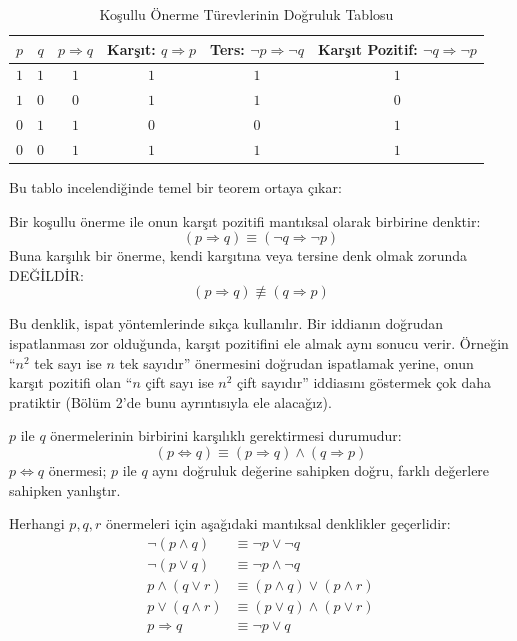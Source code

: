 \begin{table}[htbp]
\centering
\begin{tabular}{cc|c|c|c|c}
\toprule
$p$ & $q$ & $p \Rightarrow q$ & Karşıt: $q \Rightarrow p$ & Ters: $\neg p \Rightarrow \neg q$ & Karşıt Pozitif: $\neg q \Rightarrow \neg p$ \\
\midrule
$1$ & $1$ & $1$ & $1$ & $1$ & $1$ \\
$1$ & $0$ & $0$ & $1$ & $1$ & $0$ \\
$0$ & $1$ & $1$ & $0$ & $0$ & $1$ \\
$0$ & $0$ & $1$ & $1$ & $1$ & $1$ \\
\bottomrule
\end{tabular}
\caption{Koşullu Önerme Türevlerinin Doğruluk Tablosu}
\end{table}

Bu tablo incelendiğinde temel bir teorem ortaya çıkar:

\begin{theorem}
Bir koşullu önerme ile onun karşıt pozitifi mantıksal olarak birbirine denktir:
\[ (p \Rightarrow q) \equiv (\neg q \Rightarrow \neg p) \]
Buna karşılık bir önerme, kendi karşıtına veya tersine denk olmak zorunda DEĞİLDİR:
\[ (p \Rightarrow q) \not\equiv (q \Rightarrow p) \]
\end{theorem}

Bu denklik, ispat yöntemlerinde sıkça kullanılır. Bir iddianın doğrudan ispatlanması zor olduğunda, karşıt pozitifini ele almak aynı sonucu verir. Örneğin ``$n^2$ tek sayı ise $n$ tek sayıdır'' önermesini doğrudan ispatlamak yerine, onun karşıt pozitifi olan ``$n$ çift sayı ise $n^2$ çift sayıdır'' iddiasını göstermek çok daha pratiktir (Bölüm 2'de bunu ayrıntısıyla ele alacağız).

\begin{definition}
$p$ ile $q$ önermelerinin birbirini karşılıklı gerektirmesi durumudur:
\[ (p \Leftrightarrow q) \equiv (p \Rightarrow q) \land (q \Rightarrow p) \]
$p \Leftrightarrow q$ önermesi; $p$ ile $q$ aynı doğruluk değerine sahipken doğru, farklı değerlere sahipken yanlıştır.
\end{definition}

\begin{theorem}
Herhangi $p, q, r$ önermeleri için aşağıdaki mantıksal denklikler geçerlidir:
\begin{align*}
\neg(p \land q) &\equiv \neg p \lor \neg q \\
\neg(p \lor q) &\equiv \neg p \land \neg q \\
p \land (q \lor r) &\equiv (p \land q) \lor (p \land r) \\
p \lor (q \land r) &\equiv (p \lor q) \land (p \lor r) \\
p \Rightarrow q &\equiv \neg p \lor q
\end{align*}
\end{theorem}


